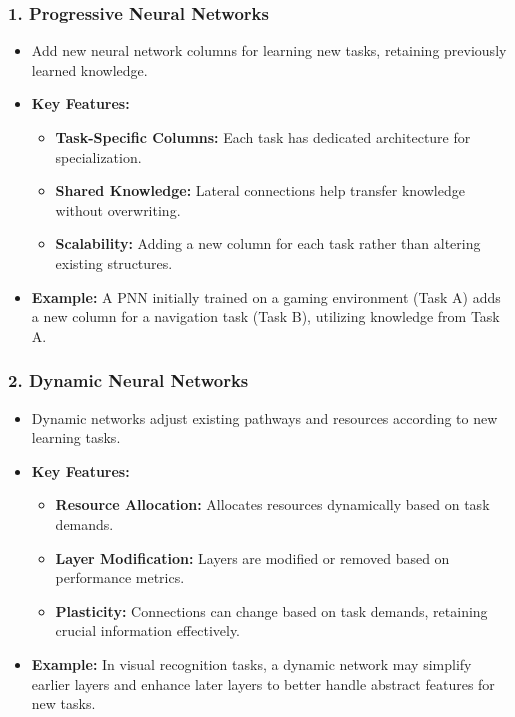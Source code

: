 \documentclass[aspectratio=169]{beamer}
\begin{document}
\begin{frame}[fragile]
    \frametitle{1. Progressive Neural Networks}
    \begin{itemize}
        \item Add new neural network columns for learning new tasks, retaining previously learned knowledge.
        \item \textbf{Key Features:}
        \begin{itemize}
            \item \textbf{Task-Specific Columns:} Each task has dedicated architecture for specialization.
            \item \textbf{Shared Knowledge:} Lateral connections help transfer knowledge without overwriting.
            \item \textbf{Scalability:} Adding a new column for each task rather than altering existing structures.
        \end{itemize}
        \item \textbf{Example:} A PNN initially trained on a gaming environment (Task A) adds a new column for a navigation task (Task B), utilizing knowledge from Task A.
    \end{itemize}
\end{frame}

\begin{frame}[fragile]
    \frametitle{2. Dynamic Neural Networks}
    \begin{itemize}
        \item Dynamic networks adjust existing pathways and resources according to new learning tasks.
        \item \textbf{Key Features:}
        \begin{itemize}
            \item \textbf{Resource Allocation:} Allocates resources dynamically based on task demands.
            \item \textbf{Layer Modification:} Layers are modified or removed based on performance metrics.
            \item \textbf{Plasticity:} Connections can change based on task demands, retaining crucial information effectively.
        \end{itemize}
        \item \textbf{Example:} In visual recognition tasks, a dynamic network may simplify earlier layers and enhance later layers to better handle abstract features for new tasks.
    \end{itemize}
\end{frame}
\end{document}
